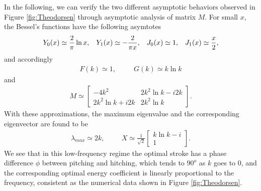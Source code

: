 In the following, we can verify the two different asymptotic behaviors observed in Figure \ref{fig:Theodorsen} through asymptotic analysis of matrix $M$.
For small $x$, the Bessel's functions have the following asymtotes
\begin{align}
Y_0(x)  \simeq  \frac{2}{\pi} \ln x,  \hspace{3mm} 
Y_1(x)  \simeq  -\frac{2}{\pi x}, \hspace{3mm}
J_0(x) \simeq 1, \hspace{3mm}
J_1(x) \simeq \frac{x}{2},
\end{align}
and accordingly
\begin{align}
F(k) \simeq 1,  \hspace{30pt}   G(k) \simeq k \ln k
\end{align}
and
\begin{align}
M \simeq \begin{bmatrix} 
-4k^2   &  2k^2 \ln k - i2k  \\
2k^2 \ln k + i2k  &   2k^2 \ln k 
\end{bmatrix}.
\end{align}
With these approximations, the maximum eigenvalue and the corresponding eigenvector are found to be
\begin{align}
\lambda_{max} \simeq 2k,   \hspace{1cm}
X \simeq   \frac{1}{\sqrt{2}}
\begin{bmatrix} k \ln k - i \\  1   \end{bmatrix}.
\end{align}
We see that in this low-frequency regime the optimal stroke has a phase difference $\phi$ between pitching and hitching, which tends to $90^o$ as $k$ goes to 0, and the corresponding optimal energy coefficient is linearly proportional to the frequency, consistent as the numerical data shown in Figure \ref{fig:Theodorsen}.

